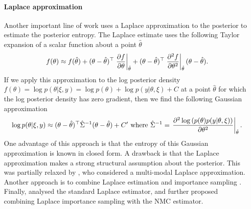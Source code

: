 \documentclass[a4paper, 10pt]{report}
\theoremstyle{plain}
\begin{document}
	\paragraph{Laplace approximation}
	Another important line of work \citep{lewi2009sequential,cavagnaro2010adaptive,long2013} uses a Laplace approximation to the posterior to estimate the posterior entropy.
	The Laplace estimate uses the following Taylor expansion of a scalar function about a point $\hat{\theta}$ 
	\begin{align}
	f(\theta) \approx f(\hat{\theta}) + (\theta-\hat{\theta})^\top \left. \frac{\partial f}{\partial \theta}\right|_{\hat{\theta}} + (\theta-\hat{\theta})^\top \left. \frac{\partial ^2 f}{\partial \theta^2} \right|_{\hat{\theta}}(\theta-\hat{\theta}).
	\end{align}
	If we apply this approximation to the log posterior density $f(\theta) = \log p(\theta|\xi,y) = \log p(\theta) + \log p(y|\theta,\xi) +C$ at a point $\hat{\theta}$ for which the log posterior density has zero gradient, then we find the following Gaussian approximation
	\begin{equation}
	\log p(\theta|\xi,y) \approx (\theta-\hat{\theta})^\top \hat{\Sigma}^{-1} (\theta- \hat{\theta}) + C' \text{ where }
	\hat{\Sigma}^{-1} = \left. \frac{\partial ^2 \log \left( p(\theta) p(y|\theta,\xi) \right)}{\partial \theta^2} \right|_{\hat{\theta}}.
	\end{equation}
	One advantage of this approach is that the entropy of this Gaussian approximation is known in closed form.
	A drawback is that the Laplace approximation makes a strong structural assumption about the posterior. This was partially relaxed by \citet{long2021multimodal}, who considered a multi-modal Laplace approximation.
	Another approach is to combine Laplace estimation and importance sampling \citep{ryan2015fully}.
	Finally, \citet{beck2018fast} analysed the standard Laplace estimator, and further proposed combining Laplace importance sampling with the NMC estimator.
	
\end{document}
